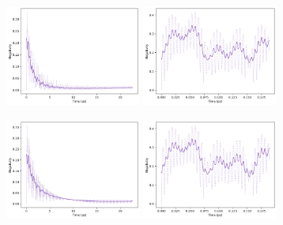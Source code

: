 \documentclass[11pt]{article}
\begin{document}
\begin{figure}[H]
    \centering
    \begin{subfigure}{\textwidth}
        \centering
        \includegraphics[width=0.49\textwidth]{Research Project/Code/results/ExVib/Open/Negativity/Envelope/neg_spont_eg.png}
        \hfill
        \includegraphics[width=0.49\textwidth]{Research Project/Code/results/ExVib/Open/Negativity/Fast/neg_spont_eg.png}
        \caption{}
        \label{fig:EVM_OQS_Neg_spont_eg}
    \end{subfigure}

    \vspace{0.8em}

    \begin{subfigure}{\textwidth}
        \centering
        \includegraphics[width=0.49\textwidth]{Research Project/Code/results/ExVib/Open/Negativity/Envelope/neg_therm_eg.png}
        \hfill
        \includegraphics[width=0.49\textwidth]{Research Project/Code/results/ExVib/Open/Negativity/Fast/neg_therm_eg.png}
        \caption{}
        \label{fig:EVM_OQS_Neg_therm_eg}
    \end{subfigure}


\end{figure}
\end{document}
